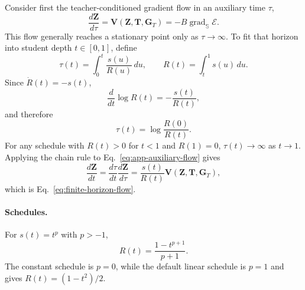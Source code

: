 Consider first the teacher-conditioned gradient flow in an auxiliary time
$\tau$,
\begin{equation}
    \frac{d\mathbf{Z}}{d\tau}
    =
    \mathbf{V}(\mathbf{Z},\mathbf{T},\mathbf{G}_T)
    =
    -B\operatorname{grad}_{\mathbb{S}}\mathcal{E}.
    \label{eq:app-auxiliary-flow}
\end{equation}
This flow generally reaches a stationary point only as
$\tau\rightarrow\infty$. To fit that horizon into student depth
$t\in[0,1]$, define
\begin{equation}
    \tau(t)
    =
    \int_0^t\frac{s(u)}{R(u)}\,du,
    \qquad
    R(t)=\int_t^1s(u)\,du.
    \label{eq:app-time-change}
\end{equation}
Since $\dot{R}(t)=-s(t)$,
\begin{equation}
    \frac{d}{dt}\log R(t)
    =
    -\frac{s(t)}{R(t)},
\end{equation}
and therefore
\begin{equation}
    \tau(t)
    =
    \log\frac{R(0)}{R(t)}.
    \label{eq:app-warped-time}
\end{equation}
For any schedule with $R(t)>0$ for $t<1$ and $R(1)=0$,
$\tau(t)\rightarrow\infty$ as $t\rightarrow1$. Applying the chain rule to
Eq.~\ref{eq:app-auxiliary-flow} gives
\begin{equation}
    \frac{d\mathbf{Z}}{dt}
    =
    \frac{d\tau}{dt}
    \frac{d\mathbf{Z}}{d\tau}
    =
    \frac{s(t)}{R(t)}
    \mathbf{V}(\mathbf{Z},\mathbf{T},\mathbf{G}_T),
\end{equation}
which is Eq.~\ref{eq:finite-horizon-flow}.

\paragraph{Schedules.}
For $s(t)=t^p$ with $p>-1$,
\begin{equation}
    R(t)
    =
    \frac{1-t^{p+1}}{p+1}.
    \label{eq:app-power-remaining-mass}
\end{equation}
The constant schedule is $p=0$, while the default linear schedule is $p=1$
and gives $R(t)=(1-t^2)/2$.

